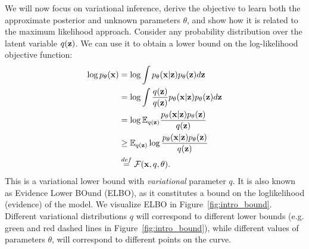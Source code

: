 We will now focus on variational inference, derive the objective to learn both the approximate posterior and unknown parameters $\theta$, and show how it is related to the maximum likelihood approach. 
Consider any probability distribution over the latent variable $q({\mathbf{z}})$. 
We can use it to obtain a lower bound on the log-likelihood objective function:
\begin{align}
    \log p_{\theta}(\rvx) &=  \log \int p_{\theta}(\rvx|\rvz)p_{\theta}(\rvz)d\rvz \label{eq:intro_elbo_def_1}\\
   &=  \log \int \frac{q(\rvz)}{q(\rvz)} p_{\theta}(\rvx|\rvz)p_{\theta}(\rvz)d\rvz \label{eq:intro_elbo_def_2}\\
   &=  \log \E_{q(\rvz)} \frac{p_{\theta}(\rvx|\rvz)p_{\theta}(\rvz)}{q(\rvz)} \label{eq:intro_elbo_def_3}\\
   &\geq  \E_{q(\rvz)}\log  \frac{p_{\theta}(\rvx|\rvz)p_{\theta}(\rvz)}{q(\rvz)} \label{eq:intro_elbo_def_4}\\
   &\overset{def}{=} \mathcal{F}(\rvx, q, \theta). \notag
\end{align}
This is a variational lower bound with \textit{variational} parameter $q$. It is also known as Evidence Lower BOund (ELBO), as it constitutes a bound on the loglikelihood (evidence) of the model. 
We visualize ELBO in Figure~\ref{fig:intro_bound}. Different variational distributions $q$ will correspond to different lower bounds (e.g. green and red dashed lines in Figure~\ref{fig:intro_bound}), while different values of parameters $\theta$, will correspond to different points on the curve. 
